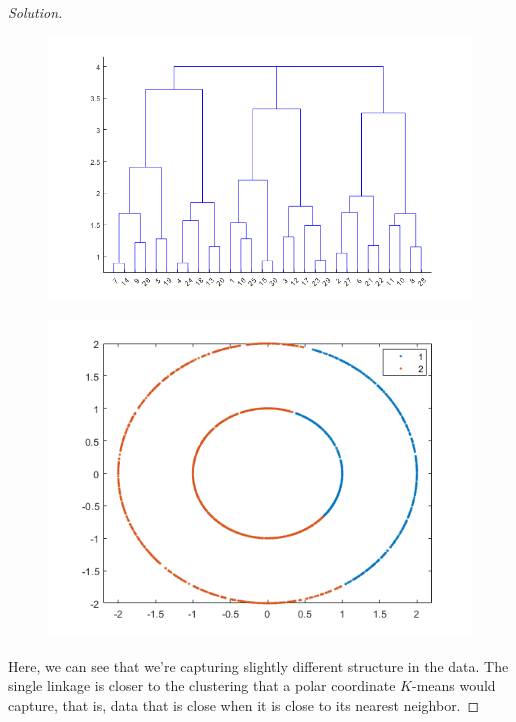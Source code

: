 \documentclass[10pt]{article}
\begin{document}
\begin{proof}[Solution]
\begin{figure}[H]
\centering
\begin{minipage}{.5\textwidth}
  \centering
  \includegraphics[width=\linewidth]{complete_linkage_dendro}
  \label{fig:test1}
\end{minipage}%
\begin{minipage}{.5\textwidth}
  \centering
  \includegraphics[width=\linewidth]{complete_linkage_clusters}
  \label{fig:test2}
\end{minipage}
\end{figure}

Here, we can see that we're capturing slightly different structure in the data. The single linkage is closer to the clustering that a polar coordinate $K$-means would capture, that is, data that is close when it is close to its nearest neighbor.


\end{proof}
\end{document}
